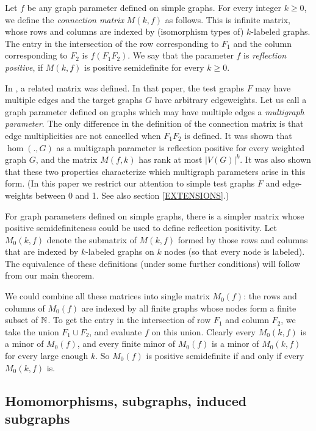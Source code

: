 \documentclass[fleqn]{article}
\begin{document}
Let $f$ be any graph parameter defined on simple graphs. For every
integer $k\ge 0$, we define the {\it connection matrix} $M(k,f)$ as
follows. This is infinite matrix, whose rows and columns are indexed
by (isomorphism types of) $k$-labeled graphs. The entry in the
intersection of the row corresponding to $F_1$ and the column
corresponding to $F_2$ is $f(F_1F_2)$. We say that the parameter $f$
is {\it reflection positive}, if $M(k,f)$ is positive semidefinite
for every $k\ge 0$.

In \cite{FLS}, a related matrix was defined. In that paper, the test
graphs $F$ may have multiple edges and the target graphs $G$ have
arbitrary edgeweights. Let us call a graph parameter defined on
graphs which may have multiple edges a {\it multigraph parameter}.
The only difference in the definition of the connection matrix is
that edge multiplicities are not cancelled when $F_1F_2$ is defined.
It was shown that $\hom(.,G)$ as a multigraph parameter is reflection
positive for every weighted graph $G$, and the matrix $M(f,k)$ has
rank at most $|V(G)|^k$. It was also shown that these two properties
characterize which multigraph parameters arise in this form. (In this
paper we restrict our attention to simple test graphs $F$ and
edge-weights between 0 and 1. See also section \ref{EXTENSIONS}.)

For graph parameters defined on simple graphs, there is a simpler
matrix whose positive semidefiniteness could be used to define
reflection positivity. Let $M_0(k,f)$ denote the submatrix of
$M(k,f)$ formed by those rows and columns that are indexed by
$k$-labeled graphs on $k$ nodes (so that every node is labeled). The
equivalence of these definitions (under some further conditions) will
follow from our main theorem.

We could combine all these matrices into single matrix $M_0(f)$: the
rows and columns of $M_0(f)$ are indexed by all finite graphs whose
nodes form a finite subset of ${\mathbb N}$. To get the entry in the
intersection of row $F_1$ and column $F_2$, we take the union
$F_1\cup F_2$, and evaluate $f$ on this union. Clearly every
$M_0(k,f)$ is a minor of $M_0(f)$, and every finite minor of $M_0(f)$
is a minor of $M_0(k,f)$ for every large enough $k$. So $M_0(f)$ is
positive semidefinite if and only if every $M_0(k,f)$ is.

\subsection{Homomorphisms, subgraphs, induced subgraphs}
\end{document}
